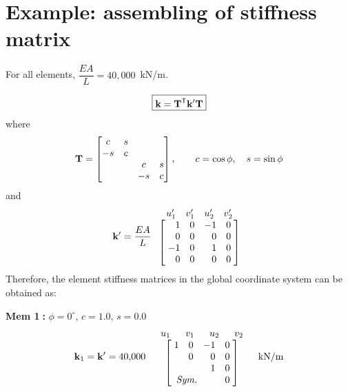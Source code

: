 \section{Example: assembling of stiffness matrix}
\begin{fig}
  
\end{fig}
For all elements, $\dfrac{EA}{L} = 40{,}000$~kN/m.
\begin{fig}
  
\end{fig}
\begin{equation}
  \boxed{\mathbf{k} = \mathbf{T}^{\mathsf{T}}\mathbf{k}'\mathbf{T}}
\end{equation}
where
\begin{equation}
  \mathbf{T} = \begin{bmatrix}c & s & & \\ -s & c & & \\ & & c & s\\ & & -s & c\end{bmatrix}, \qquad c = \cos\phi,\quad s = \sin\phi
\end{equation}
and
\begin{equation}
  \kmat' = \frac{EA}{L}\;
  \begin{array}{c}
    \begin{array}{cccc} u_1' & v_1' & u_2' & v_2' \end{array}\\
    \left[\begin{array}{@{\;}r@{\quad}r@{\quad}r@{\quad}r@{\;}}
      1 & 0 & -1 & 0\\ 0 & 0 & 0 & 0\\ -1 & 0 & 1 & 0\\ 0 & 0 & 0 & 0
    \end{array}\right]
  \end{array}
\end{equation}
Therefore, the element stiffness matrices in the global coordinate system can be obtained as:

\noindent\textbf{Mem \textcircled{\scriptsize 1}:} $\phi = 0^\circ$, $c = 1.0$, $s = 0.0$
\begin{equation}
  \kmat_1 = \kmat' = 40{,}000\;
  \begin{array}{c}
    \begin{array}{cccc} \;u_1\; & \;v_1\; & \;u_2\; & \;v_2\; \end{array}\\
    \left[\begin{array}{@{\;}r@{\quad}r@{\quad}r@{\quad}r@{\;}}
      1 & 0 & -1 & 0\\ & 0 & 0 & 0\\ & & 1 & 0\\ \multicolumn{2}{l}{\textit{Sym.}} & & 0
    \end{array}\right]
  \end{array}\;\text{kN/m}
\end{equation}

